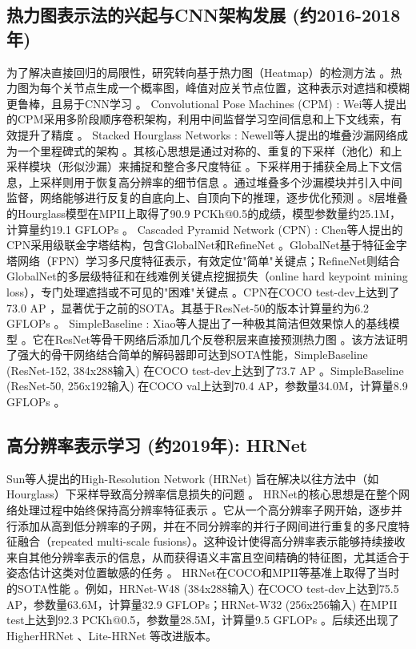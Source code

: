 \documentclass[12pt,a4paper]{article}
\begin{document}
\subsection{热力图表示法的兴起与CNN架构发展 (约2016-2018年)}
为了解决直接回归的局限性，研究转向基于热力图（Heatmap）的检测方法 \cite{Zhou2016HumanPoseSurvey}。热力图为每个关节点生成一个概率图，峰值对应关节点位置，这种表示对遮挡和模糊更鲁棒，且易于CNN学习 \cite{Cao2019OpenPose}。
Convolutional Pose Machines (CPM) \cite{Cao2019OpenPose}: Wei等人提出的CPM采用多阶段顺序卷积架构，利用中间监督学习空间信息和上下文线索，有效提升了精度 \cite{Cao2019OpenPose}。
Stacked Hourglass Networks \cite{Newell2016StackedHourglass}: Newell等人提出的堆叠沙漏网络成为一个里程碑式的架构 \cite{Newell2016StackedHourglass}。其核心思想是通过对称的、重复的下采样（池化）和上采样模块（形似沙漏）来捕捉和整合多尺度特征 \cite{Newell2016StackedHourglass}。下采样用于捕获全局上下文信息，上采样则用于恢复高分辨率的细节信息 \cite{Liu2020SMSNet}。通过堆叠多个沙漏模块并引入中间监督，网络能够进行反复的自底向上、自顶向下的推理，逐步优化预测 \cite{Newell2016StackedHourglass}。8层堆叠的Hourglass模型在MPII上取得了90.9 PCKh@0.5的成绩，模型参数量约25.1M，计算量约19.1 GFLOPs \cite{Sun2019HRNet}。
Cascaded Pyramid Network (CPN) \cite{Chen2018CPN}: Chen等人提出的CPN采用级联金字塔结构，包含GlobalNet和RefineNet \cite{Chen2018CPN}。GlobalNet基于特征金字塔网络（FPN）学习多尺度特征表示，有效定位"简单"关键点；RefineNet则结合GlobalNet的多层级特征和在线难例关键点挖掘损失（online hard keypoint mining loss），专门处理遮挡或不可见的"困难"关键点 \cite{Chen2018CPN}。CPN在COCO test-dev上达到了73.0 AP \cite{Chen2018CPN}，显著优于之前的SOTA。其基于ResNet-50的版本计算量约为6.2 GFLOPs \cite{Chen2018CPN}。
SimpleBaseline \cite{Sun2019HRNet}: Xiao等人提出了一种极其简洁但效果惊人的基线模型 \cite{Xiao2018SimpleBaselines}。它在ResNet等骨干网络后添加几个反卷积层来直接预测热力图 \cite{Xiao2018SimpleBaselines}。该方法证明了强大的骨干网络结合简单的解码器即可达到SOTA性能，SimpleBaseline (ResNet-152, 384x288输入) 在COCO test-dev上达到了73.7 AP \cite{Sun2019HRNet}。SimpleBaseline (ResNet-50, 256x192输入) 在COCO val上达到70.4 AP，参数量34.0M，计算量8.9 GFLOPs \cite{Sun2019HRNet}。

\subsection{高分辨率表示学习 (约2019年): HRNet}
Sun等人提出的High-Resolution Network (HRNet) \cite{Sun2019HRNet} 旨在解决以往方法中（如Hourglass）下采样导致高分辨率信息损失的问题 \cite{Sun2019HRNet}。
HRNet的核心思想是在整个网络处理过程中始终保持高分辨率特征表示 \cite{Sun2019HRNet}。它从一个高分辨率子网开始，逐步并行添加从高到低分辨率的子网，并在不同分辨率的并行子网间进行重复的多尺度特征融合（repeated multi-scale fusions）\cite{Sun2019HRNet}。这种设计使得高分辨率表示能够持续接收来自其他分辨率表示的信息，从而获得语义丰富且空间精确的特征图，尤其适合于姿态估计这类对位置敏感的任务 \cite{Sun2019HRNet}。
HRNet在COCO和MPII等基准上取得了当时的SOTA性能 \cite{Sun2019HRNet}。例如，HRNet-W48 (384x288输入) 在COCO test-dev上达到75.5 AP，参数量63.6M，计算量32.9 GFLOPs；HRNet-W32 (256x256输入) 在MPII test上达到92.3 PCKh@0.5，参数量28.5M，计算量9.5 GFLOPs \cite{Sun2019HRNet}。后续还出现了HigherHRNet \cite{Sun2019HRNet}、Lite-HRNet \cite{Sun2019HRNet} 等改进版本。
\end{document}
